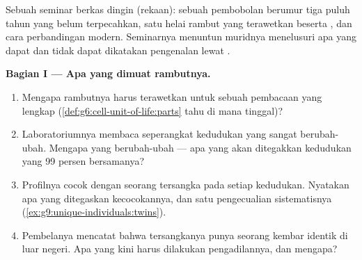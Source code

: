 \begin{problem}\label{pb:g9:unique-individuals:1}
Sebuah seminar berkas dingin (rekaan): sebuah pembobolan
berumur tiga puluh tahun yang belum terpecahkan, satu helai
rambut yang terawetkan beserta  , dan cara
perbandingan modern. Seminarnya menuntun muridnya menelusuri
apa yang dapat dan tidak dapat dikatakan pengenalan lewat .

\medskip\noindent\textbf{Bagian I --- Apa yang dimuat
rambutnya.}
\begin{enumerate}
  \item Mengapa \emph{} rambutnya harus terawetkan untuk
        sebuah pembacaan yang lengkap
        (\cref{def:g6:cell-unit-of-life:parts} tahu di mana
         tinggal)?
  \item Laboratoriumnya membaca seperangkat kedudukan yang
        sangat berubah-ubah. Mengapa yang berubah-ubah ---
        apa yang akan ditegakkan kedudukan yang 99 persen
        bersamanya?
  \item Profilnya cocok dengan seorang tersangka pada setiap
        kedudukan. Nyatakan apa yang ditegaskan kecocokannya,
        dan satu pengecualian sistematisnya
        (\cref{ex:g9:unique-individuals:twins}).
  \item Pembelanya mencatat bahwa tersangkanya punya seorang
        kembar identik di luar negeri. Apa yang kini harus
        dilakukan pengadilannya, dan mengapa?
\end{enumerate}


\end{problem}
